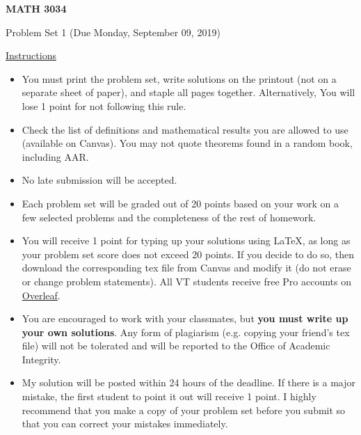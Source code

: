 \documentclass[12pt]{amsart}
\begin{document}
\hfill{}

\vspace{0.3in}
\begin{center}
{\Large{\textbf{MATH 3034}}}

\vspace{0.1in}
{\large{Problem Set 1 (Due Monday, September 09, 2019)}}
\end{center}

\vspace{0.3in}
\noindent
\underline{Instructions}
\begin{itemize}
\vspace{0.1in}
\item You must print the problem set, write solutions on the printout (not on a separate sheet of paper), and staple all pages together.  Alternatively,  You will lose 1 point for not following this rule.
\vspace{0.1in}
\item Check the list of definitions and mathematical results you are allowed to use (available on Canvas).  You may not quote theorems found in a random book, including AAR.
\vspace{0.1in}
\item No late submission will be accepted.
\vspace{0.1in}
\item Each problem set will be graded out of 20 points based on your work on a few selected problems and the completeness of the rest of homework.
\vspace{0.1in}
\item You will receive 1 point for typing up your solutions using \LaTeX, as long as your problem set score does not exceed 20 points.  If you decide to do so, then download the corresponding tex file from Canvas and modify it (do not erase or change problem statements).  All VT students receive free Pro accounts on \href{https://www.overleaf.com/edu/vtech}{Overleaf}.
\vspace{0.1in}
\item You are encouraged to work with your classmates, but \textbf{you must write up your own solutions}.  Any form of plagiarism (e.g. copying your friend's tex file) will not be tolerated and will be reported to the Office of Academic Integrity.
\vspace{0.1in}
\item My solution will be posted within 24 hours of the deadline.  If there is a major mistake, the first student to point it out will receive 1 point.  I highly recommend that you make a copy of your problem set before you submit so that you can correct your mistakes immediately.
\end{itemize}
\end{document}
